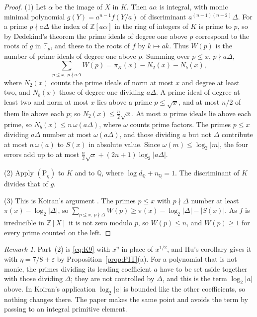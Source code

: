 \documentclass[11pt]{amsart}
\theoremstyle{definition}
\theoremstyle{remark}
\newtheorem{remark}[thm]{Remark}
\newcommand{\Z}{\mathbb Z}
\newcommand{\Q}{\mathbb Q}
\newcommand{\F}{\mathbb F}
\newcommand{\Ph}[1]{(\mathrm P_{#1})}
\begin{document}
\begin{proof}
(1) Let $\alpha$ be the image of $X$ in $K$. Then $a\alpha$ is integral, with monic minimal polynomial $g(Y)=a^{n-1}f(Y/a)$ of discriminant $a^{(n-1)(n-2)}\Delta$. For a prime $p\nmid a\Delta$ the index of $\Z[a\alpha]$ in the ring of integers of $K$ is prime to $p$, so by Dedekind's theorem the prime ideals of degree one above $p$ correspond to the roots of $g$ in $\F_p$, and these to the roots of $f$ by $k\mapsto ak$. Thus $W(p)$ is the number of prime ideals of degree one above $p$. Summing over $p\le x$, $p\nmid a\Delta$,
\[
 \sum_{p\le x,\ p\nmid a\Delta}W(p)=\pi_K(x)-N_2(x)-N_b(x),
\]
where $N_2(x)$ counts the prime ideals of norm at most $x$ and degree at least two, and $N_b(x)$ those of degree one dividing $a\Delta$. A prime ideal of degree at least two and norm at most $x$ lies above a prime $p\le\sqrt x$, and at most $n/2$ of them lie above each $p$; so $N_2(x)\le\frac n2\sqrt x$. At most $n$ prime ideals lie above each prime, so $N_b(x)\le n\,\omega(a\Delta)$, where $\omega$ counts prime factors. The primes $p\le x$ dividing $a\Delta$ number at most $\omega(a\Delta)$, and those dividing $a$ but not $\Delta$ contribute at most $n\,\omega(a)$ to $S(x)$ in absolute value. Since $\omega(m)\le\log_2|m|$, the four errors add up to at most $\frac n2\sqrt x+(2n+1)\log_2|a\Delta|$.

(2) Apply $\Ph\eta$ to $K$ and to $\Q$, where $\log d_\Q+n_\Q=1$. The discriminant of $K$ divides that of $g$.

(3) This is Koiran's argument \cite[Corollary~1, p.~282]{K96}. The primes $p\le x$ with $p\nmid\Delta$ number at least $\pi(x)-\log_2|\Delta|$, so $\sum_{p\le x,\,p\nmid\Delta}W(p)\ge\pi(x)-\log_2|\Delta|-|S(x)|$. As $f$ is irreducible in $\Z[X]$ it is not zero modulo $p$, so $W(p)\le n$, and $W(p)\ge1$ for every prime counted on the left.
\end{proof}

\begin{remark}\label{rem:monic}
Part~(2) is \eqref{eq:K9} with $x^{\eta}$ in place of $x^{1/2}$, and Hu's corollary gives it with $\eta=7/8+\varepsilon$ by Proposition~\ref{prop:PIT}(a). For a polynomial that is not monic, the primes dividing its leading coefficient $a$ have to be set aside together with those dividing $\Delta$; they are not controlled by $\Delta$, and this is the term $\log_2|a|$ above. In Koiran's application $\log_2|a|$ is bounded like the other coefficients, so nothing changes there. The paper \cite[\S17]{N} makes the same point and avoids the term by passing to an integral primitive element.
\end{remark}
\end{document}
